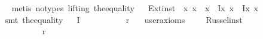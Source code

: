 \begin{isabellebody}
\isadelimproof
\ %
\endisadelimproof
%
\isatagproof
{}\isamarkupfalse%
\ {\isacharparenleft}metis\ {\isacharparenleft}no{\isacharunderscore}types{\isacharcomma}\ lifting{\isacharparenright}\ the{\isacharunderscore}equality{\isacharparenright}%
\endisatagproof
{\isafoldproof}%
%
\isadelimproof
%
\endisadelimproof
\isanewline
\isanewline
\ \isanewline
{}\isamarkupfalse%
\ Ext{\isacharunderscore}inst\ {\isacharcolon}\ {\isachardoublequoteopen}{\isacharparenleft}\isactrlbold {\isasymforall}x{\isachardot}\ {\isasymPhi}{\isacharparenleft}x{\isacharparenright}\ \isactrlbold {\isasymleftrightarrow}\ {\isasymPsi}{\isacharparenleft}x{\isacharparenright}{\isacharparenright}\ \isactrlbold {\isasymrightarrow}\ {\isacharparenleft}{\isacharparenleft}\isactrlbold Ix{\isachardot}\ {\isasymPhi}{\isacharparenleft}x{\isacharparenright}{\isacharparenright}\ \isactrlbold {\isacharequal}\ {\isacharparenleft}\isactrlbold Ix{\isachardot}\ {\isasymPsi}{\isacharparenleft}x{\isacharparenright}{\isacharparenright}{\isacharparenright}{\isachardoublequoteclose}%
\isadelimproof
\ %
\endisadelimproof
%
\isatagproof
{}\isamarkupfalse%
\ {\isacharparenleft}smt\ the{}{\isacharunderscore}equality{\isacharparenright}%
\endisatagproof
{\isafoldproof}%
%
\isadelimproof
%
\endisadelimproof
\isanewline
\isanewline
\isanewline
\ \isanewline
{}\isamarkupfalse%
\ I{}\ {\isacharcolon}\ {\isachardoublequoteopen}{\isacharparenleft}{\isasymOtimes}\ \isactrlbold {\isacharequal}\ {\isasymalpha}\ \isactrlbold {\isasymor}\ {\isasymOtimes}\ \isactrlbold {\isacharequal}\ {\isasymbeta}{\isacharparenright}\ \isactrlbold {\isasymrightarrow}\ \isactrlbold {\isasymnot}{\isacharparenleft}{\isasymalpha}\ \isactrlbold r\ {\isasymbeta}{\isacharparenright}{\isachardoublequoteclose}\ \isamarkupfalse%
\ {\isacharbrackleft}user{\isacharunderscore}axioms{\isacharbrackright}%
\isadelimproof
\ %
\endisadelimproof
%
\isatagproof
{}\isamarkupfalse%
%
\endisatagproof
{\isafoldproof}%
%
\isadelimproof
%
\endisadelimproof
\isanewline
\isanewline
\isanewline
\ \isanewline
{}\isamarkupfalse%
\ Russel{\isacharunderscore}inst\ {\isacharcolon}\ \isanewline
\ {\isachardoublequoteopen}{\isacharparenleft}{\isacharparenleft}{\isasymOtimes}\ \isactrlbold {\isacharequal}\ {\isasymalpha}\ \isactrlbold {\isasymor}\ {\isasymOtimes}\ \isactrlbold {\isacharequal}\ {\isasymbeta}{\isacharparenright}\ \isactrlbold {\isasymrightarrow}\ \isactrlbold {\isasymnot}{\isacharparenleft}{\isasymalpha}\ \isactrlbold r\ {\isasymbeta}{\isacharparenright}{\isacharparenright}\ \isanewline

\end{isabellebody}
